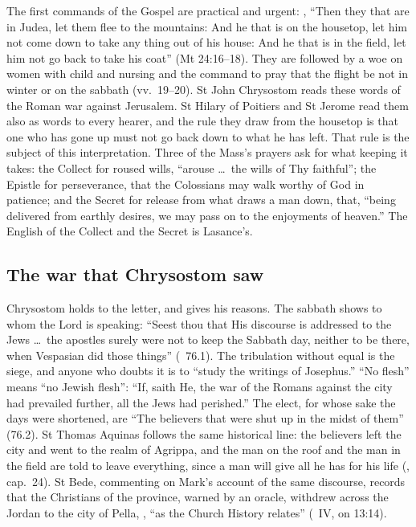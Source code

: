 
The first commands of the Gospel are practical and urgent: , ``Then they
that are in Judea, let them flee to the mountains: And he that is on the
housetop, let him not come down to take any thing out of his house: And he that
is in the field, let him not go back to take his coat'' (Mt 24:16--18). They
are followed by a woe on women with child and nursing and the command to pray
that the flight be not in winter or on the sabbath (vv.~19--20). St John
Chrysostom reads these words of the Roman war against Jerusalem. St Hilary of
Poitiers and St Jerome read them also as words to every hearer, and the rule
they draw from the housetop is that one who has gone up must not go back down
to what he has left. That rule is the subject of this interpretation. Three
of the Mass's prayers ask for what keeping it takes: the Collect for roused
wills, ``arouse \dots\ the wills of Thy faithful''; the Epistle for
perseverance, that the Colossians may walk worthy of God in patience; and the
Secret for release from what draws a man down, that, ``being delivered from
earthly desires, we may pass on to the enjoyments of heaven.'' The English of
the Collect and the Secret is Lasance's.

\subsection{The war that Chrysostom saw}
\label{sec:flight-chrysostom}

Chrysostom holds to the letter, and gives his reasons. The sabbath shows to
whom the Lord is speaking: ``Seest thou that His discourse is addressed to the
Jews \dots\ the apostles surely were not to keep the Sabbath day, neither to
be there, when Vespasian did those things'' (~76.1). The
tribulation without equal is the siege, and anyone who doubts it is to ``study
the writings of Josephus.'' ``No flesh'' means ``no Jewish flesh'': ``If, saith
He, the war of the Romans against the city had prevailed further, all the Jews
had perished.'' The elect, for whose sake the days were shortened, are ``The
believers that were shut up in the midst of them'' (76.2). St Thomas Aquinas
follows the same historical line: the believers left the city and went to the
realm of Agrippa, and the man on the roof and the man in the field are told
to leave everything, since a man will give all he has for his life
(, cap.~24). St Bede, commenting on Mark's account of
the same discourse, records that the Christians of the province, warned by an
oracle, withdrew across the Jordan to the city of Pella, , ``as the Church History relates'' (~IV, on 13:14).

